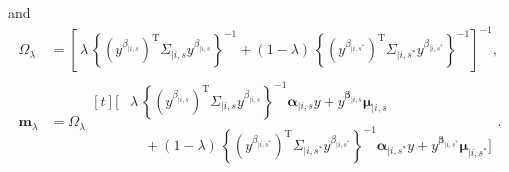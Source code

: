 \documentclass[
  12pt]{article}
\newcommand{\mvmean}[1]{\symbf{\alpha}_{\mid i, #1} y + y^{\symbf{\beta}_{\mid i, #1}} \symbf{\mu}_{\mid i, #1}}
\newcommand{\mvcov}[1]{\left(y^{\beta_{\mid i, #1}}\right)^{\mathrm{T}} \Sigma_{\mid i, #1} y^{\beta_{\mid i, #1}}}
\begin{document}
and 
\begin{align*}
\Omega_{\lambda}
  &= \left[\,\lambda\,\left\{\mvcov{s}\right\}^{-1}
           +(1-\lambda)\,\left\{\mvcov{s^{*}}\right\}^{-1}\right]^{-1},\\[6pt]
\symbf{m}_{\lambda}
  &= \Omega_{\lambda}
     \begin{aligned}[t]
       \Biggl[&\lambda\,\left\{\mvcov{s}\right\}^{-1}\mvmean{s}\\
            &\quad +(1-\lambda)\,\left\{\mvcov{s^{*}}\right\}^{-1}\mvmean{s^{*}}\Biggr]
     \end{aligned}.
\end{align*}
\end{document}
